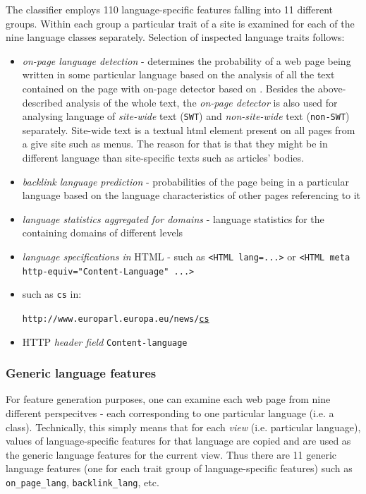 \documentclass{acm_proc_article-sp}
\begin{document}
{  The classifier employs 110 language-specific features falling into 11 different  groups. Within each group a
  particular trait of a site is examined for each of the nine language classes separately. Selection of
  inspected language traits follows: 
  \begin{itemize}
    \item \textit{on-page language detection} - 
      determines the probability of a web page being written in some particular
      language based on the analysis of all the text
      contained on the page with on-page detector based on \cite{Rehurek:languageidentification} . 
      Besides the above-described analysis of the whole text, the \textit{on-page 
      detector} is also used for analysing language of \textit{site-wide} text (\texttt{SWT}) and
    \textit{non-site-wide} text (\texttt{non-SWT}) separately. Site-wide text is a textual html element 
    present on all pages from a give site such as menus. The reason for that is that they might be 
    in different language than site-specific texts such as articles' bodies.
    \item \textit{backlink language prediction} - probabilities of the page being in a particular
      language based on the language characteristics of other pages referencing to it 
    \item \textit{language statistics aggregated for domains} - language statistics for the
      containing domains of different levels
    \item \textit{language specifications in} HTML - such as \texttt{<HTML lang=...>} or \texttt{<HTML
      meta http-equiv="Content-Language"  ...>}
    \item {} such as \texttt{cs} in:

    \texttt{http://www.europarl.europa.eu/news/}\underline{\texttt{cs}} 
    \item HTTP \textit{header field} \texttt{Content-language}
  \end{itemize}


 \subsubsection{Generic language features}
    For feature generation purposes, one can examine each web page from nine different perspecitves -
    each corresponding to one particular language (i.e. a class).
   Technically, this simply means 
    that for each \textit{view} (i.e. particular language), values of language-specific
    features for that language are copied and are used as the generic language features for the current view. Thus
    there are 11 generic language features (one for each trait group of language-specific
    features) such as \texttt{on\_page\_lang}, \texttt{backlink\_lang}, etc.
}
\end{document}
